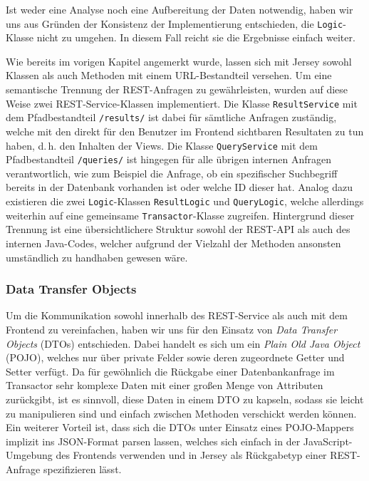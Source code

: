 Ist weder eine Analyse noch eine Aufbereitung der Daten notwendig, haben wir uns aus Gründen der Konsistenz der Implementierung entschieden, die \texttt{Logic}-Klasse nicht zu umgehen. In diesem Fall reicht sie die Ergebnisse einfach weiter.

Wie bereits im vorigen Kapitel angemerkt wurde, lassen sich mit Jersey sowohl Klassen als auch Methoden mit einem URL-Bestandteil versehen. Um eine semantische Trennung der REST-Anfragen zu gewährleisten, wurden auf diese Weise zwei REST-Service-Klassen implementiert. Die Klasse \texttt{ResultService} mit dem Pfadbestandteil \texttt{/results/} ist dabei für sämtliche Anfragen zuständig, welche mit den direkt für den Benutzer im Frontend sichtbaren Resultaten zu tun haben, d.\,h. den Inhalten der Views. Die Klasse \texttt{QueryService} mit dem Pfadbestandteil \texttt{/queries/} ist hingegen für alle übrigen internen Anfragen verantwortlich, wie zum Beispiel die Anfrage, ob ein spezifischer Suchbegriff bereits in der Datenbank vorhanden ist oder welche ID dieser hat. Analog dazu existieren die zwei \texttt{Logic}-Klassen \texttt{ResultLogic} und \texttt{QueryLogic}, welche allerdings weiterhin auf eine gemeinsame \texttt{Transactor}-Klasse zugreifen. Hintergrund dieser Trennung ist eine übersichtlichere Struktur sowohl der REST-API als auch des internen Java-Codes, welcher aufgrund der Vielzahl der Methoden ansonsten umständlich zu handhaben gewesen wäre.

\subsubsection{Data Transfer Objects}
\label{sec:dto}

Um die Kommunikation sowohl innerhalb des REST-Service als auch mit dem Frontend zu vereinfachen, haben wir uns für den Einsatz von \textit{Data Transfer Objects} (DTOs) entschieden. Dabei handelt es sich um ein \textit{Plain Old Java Object} (POJO), welches nur über private Felder sowie deren zugeordnete Getter und Setter verfügt. Da für gewöhnlich die Rückgabe einer Datenbankanfrage im Transactor sehr komplexe Daten mit einer großen Menge von Attributen zurückgibt, ist es sinnvoll, diese Daten in einem DTO zu kapseln, sodass sie leicht zu manipulieren sind und einfach zwischen Methoden verschickt werden können. Ein weiterer Vorteil ist, dass sich die DTOs unter Einsatz eines POJO-Mappers implizit ins JSON-Format parsen lassen, welches sich einfach in der JavaScript-Umgebung des Frontends verwenden und in Jersey als Rückgabetyp einer REST-Anfrage spezifizieren lässt.


